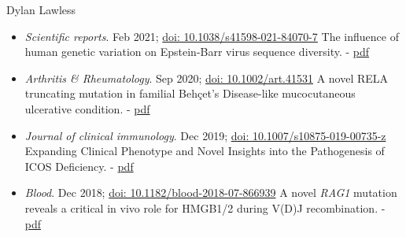 \documentclass[11pt,a4paper]{article}
\begin{document}
\begin{cv}{Dylan Lawless}
\begin{itemize}[leftmargin=*]

\item \emph{Scientific reports}. Feb 2021;
\href{https://www.nature.com/articles/s41598-021-84070-7}{doi: 10.1038/s41598-021-84070-7}
The influence of human genetic variation on Epstein-Barr virus sequence diversity. 
- \href{https://lawlessgenomics.com/resume/pdf/2021SciRepRueger_The_influence_of_human_genetic_variation_on_Epstein_Barr_virus_sequence_diversity.pdf}{pdf}


\item \emph{Arthritis \& Rheumatology}. Sep 2020;
\href{https://onlinelibrary.wiley.com/doi/10.1002/art.41531}{doi: 10.1002/art.41531}
A novel RELA truncating mutation in familial Behçet's Disease-like mucocutaneous ulcerative condition. 
- \href{https://lawlessgenomics.com/resume/pdf/2020ArthRheum_Adeeb_A_Novel_RELA_Truncating_Mutation_in_a_Familial_Behcets_Disease_like_Mucocutaneous_Ulcerative_Condition.pdf}{pdf}


\item \emph{Journal of clinical immunology}. Dec 2019; 
\href{https://link.springer.com/10.1007/s10875-019-00735-z}{doi: 10.1007/s10875-019-00735-z}
Expanding Clinical Phenotype and Novel Insights into the Pathogenesis of ICOS Deficiency. 
- \href{https://lawlessgenomics.com/resume/pdf/2020JOCIAbolhassaniExpandingClinicalPhenotypeAndNovelInsightsintothePathogenesisofICOSDeficiency.pdf}{pdf}


\item \emph{Blood}. Dec 2018; 
\href{https://doi.org/10.1182/blood-2018-07-866939}{doi: 10.1182/blood-2018-07-866939}
A novel \textit{RAG1}  mutation reveals a critical in vivo role for HMGB1/2 during V(D)J recombination.  
- \href{https://lawlessgenomics.com/resume/pdf/2018BloodThwaites_A\%20novel\%20RAG1\%20mutation\%20reveals\%20a\%20critical\%20in\%20vivo\%20role\%20for\%20HMGB1_2\%20during\%20V(D)J\%20recombination.pdf}{pdf}



\end{itemize}
\end{cv}
\end{document}

